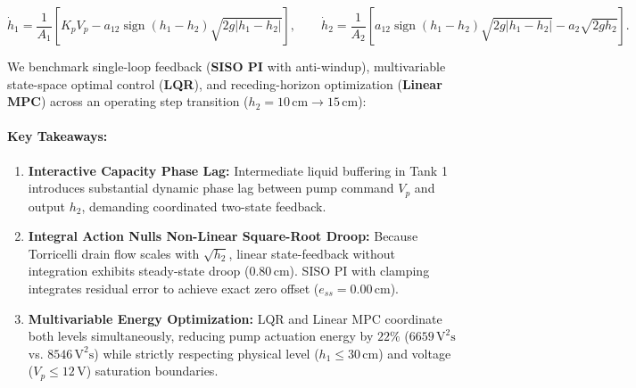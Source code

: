 \documentclass[11pt,a4paper]{article}
\begin{document}
\begin{equation}
\dot h_1 = \frac{1}{A_1}\left[K_p V_p - a_{12}\operatorname{sign}(h_1 - h_2)\sqrt{2g|h_1 - h_2|}\right], \qquad \dot h_2 = \frac{1}{A_2}\left[a_{12}\operatorname{sign}(h_1 - h_2)\sqrt{2g|h_1 - h_2|} - a_2\sqrt{2g h_2}\right].
\end{equation}

We benchmark single-loop feedback (\textbf{SISO PI} with anti-windup), multivariable state-space optimal control (\textbf{LQR}), and receding-horizon optimization (\textbf{Linear MPC}) across an operating step transition ($h_2 = 10\,\text{cm} \to 15\,\text{cm}$):

\begin{table}[H]
\centering
\small
{}
\caption{Benchmark results for Experiment 30: Coupled two-tank liquid level regulation and capacity dynamics (from \texttt{experiments/30\_two\_tank\_level\_control/table.md}).}
\label{tab:exp30}
\end{table}

\paragraph{Key Takeaways:}
\begin{enumerate}[nosep]
  \item \textbf{Interactive Capacity Phase Lag:} Intermediate liquid buffering in Tank 1 introduces substantial dynamic phase lag between pump command $V_p$ and output $h_2$, demanding coordinated two-state feedback.
  \item \textbf{Integral Action Nulls Non-Linear Square-Root Droop:} Because Torricelli drain flow scales with $\sqrt{h_2}$, linear state-feedback without integration exhibits steady-state droop ($0.80\,\text{cm}$). SISO PI with clamping integrates residual error to achieve exact zero offset ($e_{ss} = 0.00\,\text{cm}$).
  \item \textbf{Multivariable Energy Optimization:} LQR and Linear MPC coordinate both levels simultaneously, reducing pump actuation energy by $22\%$ ($6659\,\text{V}^2\text{s}$ vs. $8546\,\text{V}^2\text{s}$) while strictly respecting physical level ($h_1 \le 30\,\text{cm}$) and voltage ($V_p \le 12\,\text{V}$) saturation boundaries.
\end{enumerate}
\end{document}
